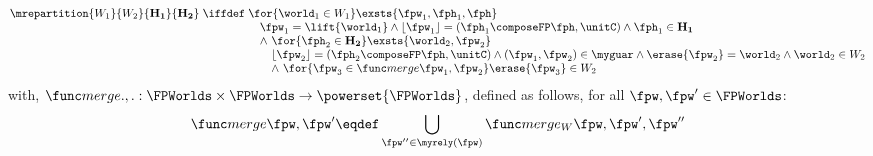 %
%
%
\begin{definition}[Repartitioning]
\[
	\mrepartition{W_1 }{W_2}{\mathbf{H_1}}{\mathbf{H_2}} \; \iffdef \;
	\begin{array}[t]{@{} l @{}}
		\for{\world_1 \in W_1} \exsts{\fpw_1, \fph_1, \fph}\\
		\quad \fpw_1 = \lift{\world_1} \land \flatten{\fpw_1} = (\fph_1 \composeFP \fph, \unitC) \land \fph_1 \in \mathbf{H_1} \\
		\quad \land\ \for{\fph_2 \in \mathbf{H_2}} \exsts{\world_2, \fpw_2} \\
		\qquad \flatten{\fpw_2} = (\fph_2 \composeFP \fph, \unitC) \land (\fpw_1, \fpw_2) \in \myguar \land \erase{\fpw_2} = \world_2 \land \world_2 \in W_2 \\
		\qquad \land\ \for{\fpw_3 \in \mergeW{\fpw_1}{\fpw_2}} \erase{\fpw_3} \in W_2
	\end{array}
\]
with, $\mergeW{.}{.}: \FPWorlds \times \FPWorlds \rightarrow \powerset{\FPWorlds}$, defined as follows, for all $\fpw, \fpw' \in \FPWorlds$:
%
\[
	\mergeW{\fpw}{\fpw'} \eqdef \bigcup\limits_{\fpw'' \in \myrely(\fpw)} \mergeWAux{\fpw}{\fpw'}{\fpw''}
\]
%
\end{definition}
